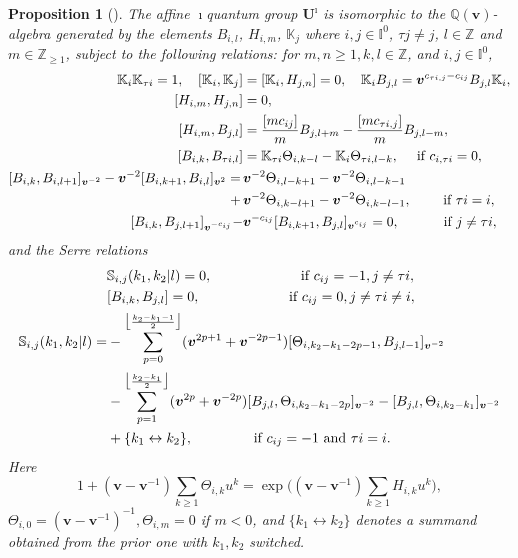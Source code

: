 \documentclass[11pt,reqno]{amsart}
\numberwithin{equation}{section}
\newtheorem{prop}[thm]{Proposition}
\theoremstyle{definition}
\theoremstyle{remark}
\newcommand{\beq}{\begin{equation}}
\newcommand{\eeq}{\end{equation}}
\newcommand{\bS}{\mathbb{S}}
\newcommand{\gge}{\geqslant}
\newcommand{\bv}{{\bm{v}}}
\def \TH{\Theta}
\def \I{\mathbb{I}}
\def \TH{\Theta}
\def \tUi{\mathbf{U}^\imath}
\def \Q{\mathbb{Q}}
\def \K{\mathbb{K}}
\def \Z{\mathbb{Z}}
\begin{document}
\begin{prop}[]
\label{thm:qsiDR}
The affine $\imath$quantum group $\tUi$ is isomorphic to the $\Q(\bv)$-algebra generated by the elements $B_{i,l}$, $H_{i,m}$, $\K_j$ where $i,j\in \I^0$, $\tau j\neq j$, $l\in\Z$ and $m \in \Z_{\gge 1}$, subject to the following relations: for $m, n \gge 1, k, l \in \Z$, and $i, j \in \I^0$,
\begin{align}
\K_i\K_{\tau i}=1, \quad [\K_i,\K_j]&  =  
[\K_i,H_{j,n}]=0,\quad \K_i B_{j,l}=\bv^{c_{\tau i,j}-c_{ij}} B_{j,l} \K_i,
\label{qsiDR0}
\\
\label{qsiDR1}
 [H_{i,m},H_{j,n}] &=0,
\\
\label{qsiDR2}
[H_{i,m},B_{j,l}] &=\frac{[mc_{ij}]}{m} B_{j,l+m}-\frac{[mc_{\tau i,j}]}{m} B_{j,l-m},
\\
\label{qsiDR4}
[B_{i,k},B_{\tau i,l}]
&= \K_{\tau i}  \TH_{i,k-l}- \K_{i} \Theta_{\tau i,l-k},
 \quad \text{ if }c_{i,\tau i}=0,
\\
\notag [B_{i,k},B_{i,l+1}]_{\bv^{-2}}-\bv^{-2}[B_{i,k+1},B_{i,l}]_{\bv^{2}}
=\,&\bv^{-2} \Theta_{i,l-k+1}-  \bv^{-2} \Theta_{i,l-k-1}
\\
+\,&\bv^{-2} \Theta_{i,k-l+1}  -\bv^{-2} \Theta_{i,k-l-1},  \qquad\text{ if } \tau i =i,
\label{qsiDR5}
\\ 
\label{qsiDR3}
[B_{i,k},B_{j,l+1}]_{\bv^{-c_{ij}}} -&\bv^{-c_{ij}}[B_{i,k+1},B_{j,l}]_{\bv^{c_{ij}}} =0, \qquad\hskip0.32cm \text{ if } j\neq \tau i,
\end{align}
and the Serre relations
\begin{align}
	&\bS_{i,j}(k_1,k_2|l)
	= 0, \qquad\qquad\qquad \text{ if }c_{ij}=-1, j \neq \tau i, \label{qsiDR9}
 \\
 &[B_{i,k},B_{j,l}]
	= 0, \qquad\qquad\qquad \text{ if }c_{ij}=0, j \neq \tau i\neq i, \label{qsiDR9'}
  \\\notag
	\bS_{i,j}(k_1,k_2|l)  
		 =&-\sum_{p=0}^{\bigl\lfloor\frac{k_2-k_1-1}{2}\bigr\rfloor } (\bv^{2p+1}+\bv^{-2p-1}) [\Theta_{i,k_2-k_1-2p-1},B_{j,l-1}]_{\bv^{-2}} \\
&-\sum_{p=1}^{\bigl\lfloor\frac{k_2-k_1 }{2}\bigr\rfloor} (\bv^{2p}+\bv^{-2p})[B_{j,l},\Theta_{i,k_2-k_1-2p}]_{\bv^{-2}}-[B_{j,l},\Theta_{i,k_2-k_1}]_{\bv^{-2}}
			   \label{qsiDR8}
\\\notag
&  +\{k_1 \leftrightarrow k_2\},\qquad\qquad \text{ if }c_{ij}=-1 \text{ and }\tau i=i.
\end{align}
Here
\beq\label{exp}
1+(\bv-\bv^{-1})\sum_{k\gge 1}\Theta_{i,k}u^k=\exp\big((\bv-\bv^{-1})\sum_{k\gge 1}H_{i,k}u^k \big),
\eeq
$\Theta_{i,0}=(\bv-\bv^{-1})^{-1},\Theta_{i,m}=0$ if $m<0$, and $\{k_1\leftrightarrow k_2\}$ denotes a summand obtained from the prior one with $k_1, k_2$ switched.
\end{prop}
\end{document}
